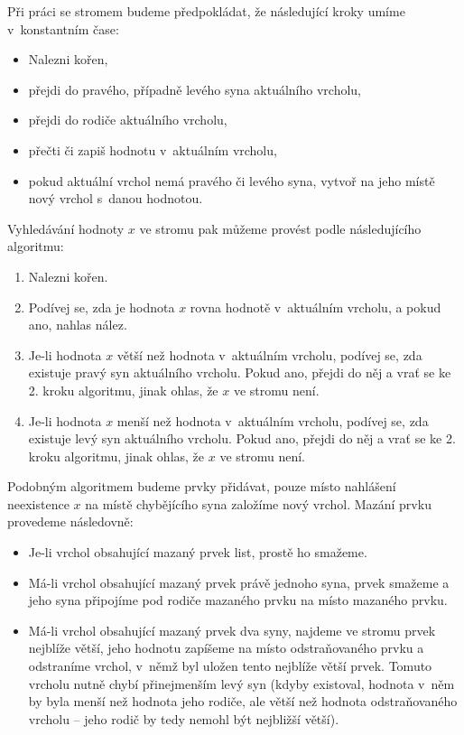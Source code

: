 Při práci se stromem budeme předpokládat, že následující kroky umíme v~konstantním čase:
\begin{itemize}
\item Nalezni kořen,
\item přejdi do pravého, případně levého syna aktuálního vrcholu,
\item přejdi do rodiče aktuálního vrcholu,
\item přečti či zapiš hodnotu v~aktuálním vrcholu,
\item pokud aktuální vrchol nemá pravého či levého syna, vytvoř na jeho místě nový vrchol s~danou hodnotou.
\end{itemize}
Vyhledávání hodnoty $x$ ve stromu pak můžeme provést podle následujícího algoritmu:
\begin{enumerate}
\item Nalezni kořen.
\item Podívej se, zda je hodnota $x$ rovna hodnotě v~aktuálním vrcholu, a pokud ano, nahlas nález.
\item Je-li hodnota $x$ větší než hodnota v~aktuálním vrcholu, podívej se, zda existuje pravý syn aktuálního vrcholu. Pokud ano, přejdi do něj a vrať se ke 2. kroku algoritmu, jinak ohlas, že  $x$ ve stromu není.
\item Je-li hodnota $x$ menší než hodnota v~aktuálním vrcholu, podívej se, zda existuje levý syn aktuálního vrcholu. Pokud ano, přejdi do něj a vrať se ke 2. kroku algoritmu, jinak ohlas, že  $x$ ve stromu není.
\end{enumerate}

Podobným algoritmem budeme prvky přidávat, pouze místo nahlášení neexistence $x$ na místě chybějícího syna založíme nový vrchol. Mazání prvku provedeme následovně:

\begin{itemize}
\item Je-li vrchol obsahující mazaný prvek list, prostě ho smažeme.
\item Má-li vrchol obsahující mazaný prvek právě jednoho syna, prvek smažeme a jeho syna připojíme pod rodiče mazaného prvku na místo mazaného prvku.
\item Má-li vrchol obsahující mazaný prvek dva syny, najdeme ve stromu prvek nejblíže větší, jeho
hodnotu zapíšeme na místo odstraňovaného prvku a odstraníme vrchol, v~němž byl uložen tento nejblíže větší
prvek. Tomuto vrcholu nutně chybí přinejmenším levý syn (kdyby existoval, hodnota
v~něm by byla menší než hodnota jeho rodiče, ale větší než hodnota odstraňovaného
vrcholu -- jeho rodič by tedy nemohl být nejbližší větší).  
\end{itemize} 

